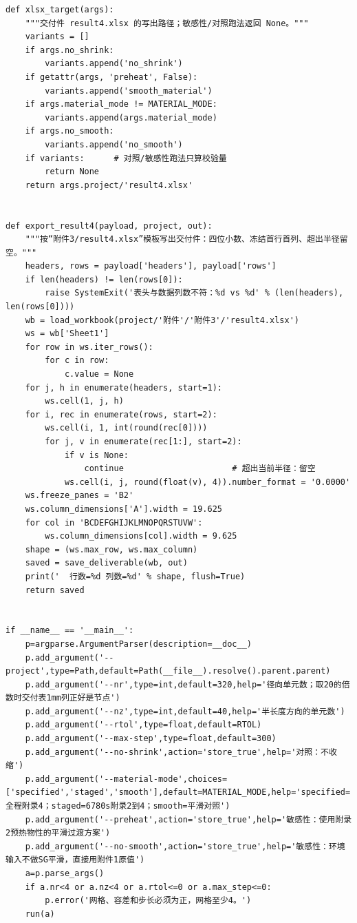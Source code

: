 \documentclass[12pt,a4paper]{ctexart}
\begin{document}
\begin{lstlisting}[caption={solve\_problem4.py }]
def xlsx_target(args):
    """交付件 result4.xlsx 的写出路径；敏感性/对照跑法返回 None。"""
    variants = []
    if args.no_shrink:
        variants.append('no_shrink')
    if getattr(args, 'preheat', False):
        variants.append('smooth_material')
    if args.material_mode != MATERIAL_MODE:
        variants.append(args.material_mode)
    if args.no_smooth:
        variants.append('no_smooth')
    if variants:      # 对照/敏感性跑法只算校验量
        return None
    return args.project/'result4.xlsx'


def export_result4(payload, project, out):
    """按“附件3/result4.xlsx”模板写出交付件：四位小数、冻结首行首列、超出半径留空。"""
    headers, rows = payload['headers'], payload['rows']
    if len(headers) != len(rows[0]):
        raise SystemExit('表头与数据列数不符：%d vs %d' % (len(headers), len(rows[0])))
    wb = load_workbook(project/'附件'/'附件3'/'result4.xlsx')
    ws = wb['Sheet1']
    for row in ws.iter_rows():
        for c in row:
            c.value = None
    for j, h in enumerate(headers, start=1):
        ws.cell(1, j, h)
    for i, rec in enumerate(rows, start=2):
        ws.cell(i, 1, int(round(rec[0])))
        for j, v in enumerate(rec[1:], start=2):
            if v is None:
                continue                      # 超出当前半径：留空
            ws.cell(i, j, round(float(v), 4)).number_format = '0.0000'
    ws.freeze_panes = 'B2'
    ws.column_dimensions['A'].width = 19.625
    for col in 'BCDEFGHIJKLMNOPQRSTUVW':
        ws.column_dimensions[col].width = 9.625
    shape = (ws.max_row, ws.max_column)
    saved = save_deliverable(wb, out)
    print('  行数=%d 列数=%d' % shape, flush=True)
    return saved


if __name__ == '__main__':
    p=argparse.ArgumentParser(description=__doc__)
    p.add_argument('--project',type=Path,default=Path(__file__).resolve().parent.parent)
    p.add_argument('--nr',type=int,default=320,help='径向单元数；取20的倍数时交付表1mm列正好是节点')
    p.add_argument('--nz',type=int,default=40,help='半长度方向的单元数')
    p.add_argument('--rtol',type=float,default=RTOL)
    p.add_argument('--max-step',type=float,default=300)
    p.add_argument('--no-shrink',action='store_true',help='对照：不收缩')
    p.add_argument('--material-mode',choices=['specified','staged','smooth'],default=MATERIAL_MODE,help='specified=全程附录4；staged=6780s附录2到4；smooth=平滑对照')
    p.add_argument('--preheat',action='store_true',help='敏感性：使用附录2预热物性的平滑过渡方案')
    p.add_argument('--no-smooth',action='store_true',help='敏感性：环境输入不做SG平滑，直接用附件1原值')
    a=p.parse_args()
    if a.nr<4 or a.nz<4 or a.rtol<=0 or a.max_step<=0:
        p.error('网格、容差和步长必须为正，网格至少4。')
    run(a)
\end{lstlisting}
\end{document}
